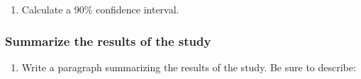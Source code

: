 \documentclass[
]{report}
\providecommand{\tightlist}{%
  \setlength{\itemsep}{0pt}\setlength{\parskip}{0pt}}
\begin{document}
\vspace{0.6in}

\begin{enumerate}
\def\labelenumi{\arabic{enumi}.}
\setcounter{enumi}{7}
\tightlist
\item
  Calculate a 90\% confidence interval.
\end{enumerate}

\vspace{0.6in}

\newpage

\subsubsection*{Summarize the results of the study}\label{summarize-the-results-of-the-study}

\begin{enumerate}
\def\labelenumi{\arabic{enumi}.}
\setcounter{enumi}{8}
\tightlist
\item
  Write a paragraph summarizing the results of the study. Be sure to describe:
\end{enumerate}
\end{document}
